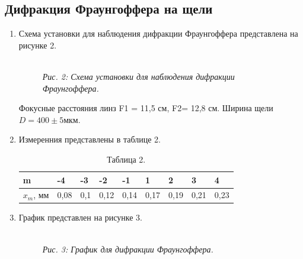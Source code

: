 \newpage

\subsection{Дифракция Фраунгоффера на щели}

\begin{enumerate}
    \item Схема установки для наблюдения дифракции Фраунгоффера представлена на рисунке 2.

    \begin{figure}[h!]
        \\
        \textit{Рис. 2: Схема установки для наблюдения дифракции Фраунгоффера.}
    \end{figure}

    Фокусные расстояния линз F1 = 11,5 см, F2= 12,8 см. Ширина щели $D=400\pm5 $мкм.

    \item Измеренния представлены в таблице 2.

    \begin{table}[h!]
        \begin{center}
            \caption{Таблица 2.}
            \begin{tabular}{|l|l|l|l|l|l|l|l|l|}
            \hline
            m & -4 & -3 & -2 & -1 & 1 & 2 & 3 & 4 \\ \hline
            $x_m$, мм & 0,08 & 0,1 & 0,12 & 0,14 & 0,17 & 0,19 & 0,21 & 0,23 \\ \hline
            \end{tabular}
        \end{center}
        \end{table}

    \item График представлен на рисунке 3.
    
    \begin{figure}[h!]
        \\
        \textit{Рис. 3: График для дифракции Фраунгоффера.}
    \end{figure}


\end{enumerate}
